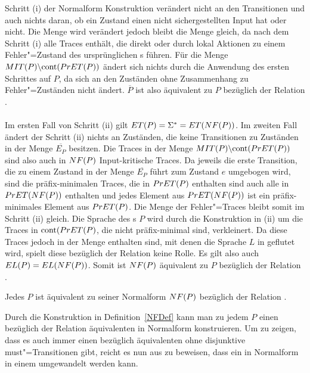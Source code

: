 Schritt (i) der Normalform Konstruktion verändert nicht an den Transitionen
und auch nichts daran, ob ein Zustand einen nicht sichergestellten Input hat
oder nicht. Die Menge \StET{} wird verändert jedoch bleibt die Menge \PrET{}
gleich, da \StET{} nach dem Schritt (i) alle Traces enthält, die direkt oder
durch lokal Aktionen zu einem Fehler"=Zustand des ursprünglichen \MEIO{}s
führen. Für die Menge $MIT (P)\backslash\mathrm{cont} (PrET (P))$ ändert sich nichts
durch die Anwendung des ersten Schrittes auf $P$, da sich an den Zuständen ohne
Zusammenhang zu Fehler"=Zuständen nicht ändert. $\overline{P}$ ist also
äquivalent zu $P$ bezüglich der Relation \ERel{}.\\
\\
Im ersten Fall von Schritt (ii) gilt $ET (P) = \Sigma ^* = ET (NF (P))$. Im
zweiten Fall ändert der Schritt (ii) nichts an Zuständen, die keine
Transitionen zu Zuständen in der Menge $\overline{E_P}$ besitzen. Die Traces
in der Menge $MIT (P)\backslash\mathrm{cont} (PrET (P))$ sind also auch in $NF (P)$
Input-kritische Traces. Da jeweils die erste Transition, die zu einem Zustand
in der Menge $\overline{E _P}$ führt zum Zustand $e$ umgebogen wird, sind die
präfix-minimalen Traces, die in $PrET (P)$ enthalten sind auch alle in $PrET
(NF (P))$ enthalten und jedes Element aus $PrET (NF (P))$ ist ein
präfix-minimales Element aus $PrET (P)$. Die Menge der Fehler"=Traces \ET{}
bleibt somit im Schritt (ii) gleich. Die Sprache des \MEIO{}s $P$ wird durch
die Konstruktion in (ii) um die Traces in $\mathrm{cont} (PrET (P)$, die nicht
präfix-minimal sind, verkleinert. Da diese Traces jedoch in der Menge \ET{}
enthalten sind, mit denen die Sprache $L$ in \EL{} geflutet wird, spielt diese
bezüglich der Relation \ERel{} keine Rolle. Es gilt also auch $EL (P) = EL
(NF (P))$. Somit ist $NF (P)$ äquivalent zu $P$ bezüglich der Relation
\ERel{}.

\begin{Prop}[Normalform]
  Jedes \MEIO{} $P$ ist äquivalent zu seiner Normalform $NF (P)$ bezüglich
  der Relation \ERel{}.
\end{Prop}

Durch die Konstruktion in Definition~\ref{NFDef} kann man zu jedem \MEIO{} $P$
einen bezüglich der Relation \ERel{} äquivalenten \MEIO{} in Normalform
konstruieren. Um zu zeigen, dass es auch immer einen bezüglich \ERel{}
äquivalenten \MIA{} ohne disjunktive must"=Transitionen gibt, reicht es nun
aus zu beweisen, dass ein \MEIO{} in Normalform in einem \MIA{} umgewandelt
werden kann.


